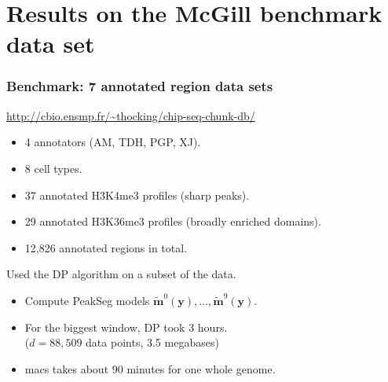 \documentclass{beamer}
\begin{document}
\section{Results on the McGill benchmark data set}

\begin{frame}
  \frametitle{Benchmark: 7 annotated region data sets}
  \url{http://cbio.ensmp.fr/~thocking/chip-seq-chunk-db/}
  \begin{itemize}
  \item 4 annotators (AM, TDH, PGP, XJ).
  \item 8 cell types.
  \item 37 annotated H3K4me3 profiles (sharp peaks).
  \item 29 annotated H3K36me3 profiles (broadly enriched domains).
  \item 12,826 annotated regions in total.
  \end{itemize}
  Used the DP algorithm on a subset of the data.
  \begin{itemize}
  \item Compute PeakSeg models $\mathbf{\tilde m}^0(\mathbf y), \dots,
    \mathbf{\tilde m}^{9}(\mathbf y)$.
  \item For the biggest window, DP took 3 hours.\\
    ($d=88,509$ data points, 3.5  megabases)
  \item macs takes about 90 minutes for one whole genome.
  \end{itemize}
\end{frame}
\end{document}
